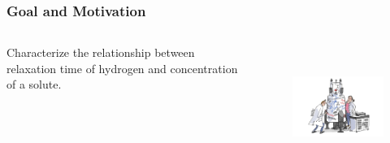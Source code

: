 \begin{frame}
  \frametitle{Goal and Motivation}
        \begin{columns}
                \column[t]{5cm}
                \vspace{25mm}
                

                Characterize the relationship between relaxation time of hydrogen and concentration of a solute.
                \column[t]{5cm}
        \begin{figure}[htbp!]
        \begin{center}
      \includegraphics[height=4cm]{./images/cartoon.jpg}
    \end{center}
          \caption{\cite{cady_2020}}
    \label{fig:cartoon}
  \end{figure}
        \end{columns}
\end{frame}

